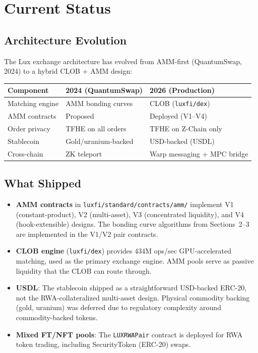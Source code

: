 \documentclass[11pt,a4paper]{article}
\begin{document}
\section{Current Status}\label{sec:current}

\subsection{Architecture Evolution}

The Lux exchange architecture has evolved from AMM-first
(QuantumSwap, 2024) to a hybrid CLOB + AMM design:

\begin{center}
\begin{tabular}{lll}
\toprule
\textbf{Component} & \textbf{2024 (QuantumSwap)} & \textbf{2026 (Production)} \\
\midrule
Matching engine & AMM bonding curves & CLOB (\texttt{luxfi/dex}) \\
AMM contracts & Proposed & Deployed (V1--V4) \\
Order privacy & TFHE on all orders & TFHE on Z-Chain only \\
Stablecoin & Gold/uranium-backed & USD-backed (USDL) \\
Cross-chain & ZK teleport & Warp messaging + MPC bridge \\
\bottomrule
\end{tabular}
\end{center}

\subsection{What Shipped}

\begin{itemize}[nosep]
  \item \textbf{AMM contracts} in \texttt{luxfi/standard/contracts/amm/}
        implement V1 (constant-product), V2 (multi-asset), V3
        (concentrated liquidity), and V4 (hook-extensible) designs.
        The bonding curve algorithms from Sections~2--3 are implemented
        in the V1/V2 pair contracts.
  \item \textbf{CLOB engine} (\texttt{luxfi/dex}) provides 434M ops/sec
        GPU-accelerated matching, used as the primary exchange engine.
        AMM pools serve as passive liquidity that the CLOB can route
        through.
  \item \textbf{USDL}: The stablecoin shipped as a straightforward
        USD-backed ERC-20, not the RWA-collateralized multi-asset
        design. Physical commodity backing (gold, uranium) was deferred
        due to regulatory complexity around commodity-backed tokens.
  \item \textbf{Mixed FT/NFT pools}: The \texttt{LUXRWAPair} contract
        is deployed for RWA token trading, including SecurityToken
        (ERC-20) swaps.
\end{itemize}
\end{document}
